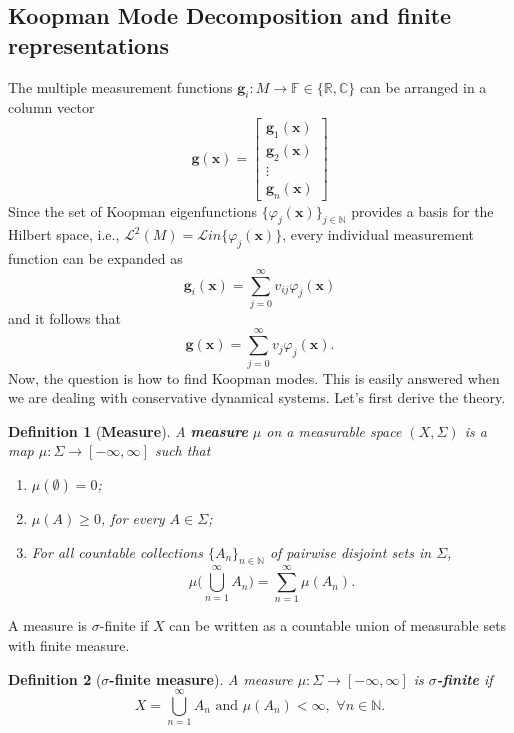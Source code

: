 \documentclass[]{article}
\newtheorem{definition}{Definition}
\begin{document}
\subsection{Koopman Mode Decomposition and finite representations}
The multiple measurement functions $\textbf{g}_i:M \to \mathbb{F} \in \{\mathbb{R}, \mathbb{C}\}$ can be arranged in a column vector
\begin{equation}
	\textbf{g}(\textbf{x}) = \begin{bmatrix}
		\textbf{g}_1(\textbf{x}) \\
		\textbf{g}_2(\textbf{x}) \\
		\vdots \\
		\textbf{g}_n(\textbf{x})
	\end{bmatrix}
\end{equation}
Since the set of Koopman eigenfunctions $\{\varphi_j(\textbf{x})\}_{j \in \mathbb{N}}$ provides a basis for the Hilbert space, i.e., $\mathcal{L}^2(M) = \mathcal{L}in\{\varphi_j(\textbf{x})\}$, every individual measurement function can be expanded as 
\begin{equation}
	\textbf{g}_i(\textbf{x}) = \sum_{j=0}^{\infty} v_{ij} \varphi_j(\textbf{x})
\end{equation}
and it follows that
\begin{equation}
	\textbf{g}(\textbf{x}) = \sum_{j=0}^{\infty} v_j \varphi_j(\textbf{x}).
\end{equation}
Now, the question is how to find Koopman modes. This is easily answered when we are dealing with conservative dynamical systems. Let's first derive the theory.
\begin{definition}[\textbf{Measure}]
A \textbf{measure} $\mu$ on a measurable space $(X,\Sigma)$ is a map $\mu:\Sigma \to [-\infty,\infty]$ such that
\begin{enumerate}
	\item $\mu(\emptyset)=0$;
	\item $\mu(A) \geq 0$, for every $A \in \Sigma$;
	\item For all countable collections $\{A_n\}_{n \in \mathbb{N}}$ of pairwise disjoint sets in $\Sigma$,
	\begin{equation}
		\mu\bigg(\bigcup_{n=1}^{\infty} A_n\bigg) = \sum_{n=1}^{\infty} \mu(A_n).
	\end{equation}
\end{enumerate}
\end{definition}
A measure is $\sigma$-finite if $X$ can be written as a countable union of measurable sets with finite measure.
\begin{definition}[\textbf{$\sigma$-finite measure}]
A measure $\mu: \Sigma \to [-\infty,\infty]$ is \textbf{$\sigma$-finite} if
\begin{equation}
	X=\bigcup_{n=1}^{\infty} A_n \,\, \text{and} \,\, \mu(A_n) < \infty, \,\, \forall n \in \mathbb{N}.
\end{equation}
\end{definition}
\end{document}
